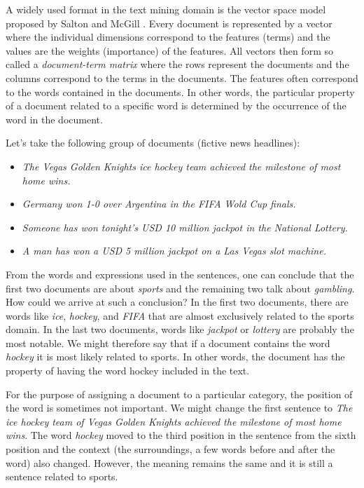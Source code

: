A widely used format in the text mining domain is the vector space model
proposed by Salton and McGill \cite{ref236}. Every document is represented by a vector
where the individual dimensions correspond to the features (terms) and the values
are the weights (importance) of the features. All vectors then form so called a
\textit{document-term matrix} where the rows represent the documents and the columns
correspond to the terms in the documents. The features often correspond to the words contained in the documents. In other words, the particular property of a
document related to a specific word is determined by the occurrence of the word
in the document.

Let’s take the following group of documents (fictive news headlines):

\begin{itemize}
    \item \textit{The Vegas Golden Knights ice hockey team achieved the milestone of most
home wins.}
    \item \textit{Germany won 1-0 over Argentina in the FIFA Wold Cup finals.}
    \item \textit{Someone has won tonight’s USD 10 million jackpot in the National Lottery.
}
    \item \textit{A man has won a USD 5 million jackpot on a Las Vegas slot machine.}
\end{itemize}

From the words and expressions used in the sentences, one can conclude
that the first two documents are about \textit{sports} and the remaining two talk about
\textit{gambling}. How could we arrive at such a conclusion? In the first two documents,
there are words like \textit{ice}, \textit{hockey}, and \textit{FIFA} that are almost exclusively related to
the sports domain. In the last two documents, words like \textit{jackpot} or \textit{lottery} are
probably the most notable. We might therefore say that if a document contains
the word \textit{hockey} it is most likely related to sports. In other words, the document
has the property of having the word hockey included in the text.

For the purpose of assigning a document to a particular category, the position
of the word is sometimes not important. We might change the first sentence to
\textit{The ice hockey team of Vegas Golden Knights achieved the milestone of most
home wins}. The word \textit{hockey} moved to the third position in the sentence from
the sixth position and the context (the surroundings, a few words before and
after the word) also changed. However, the meaning remains the same and it is
still a sentence related to sports.

